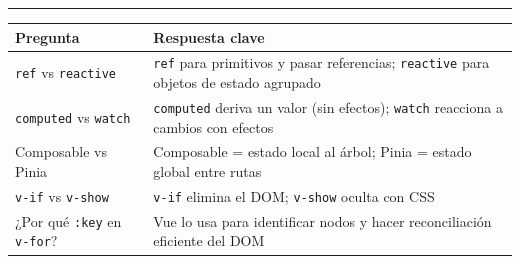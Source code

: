 \documentclass[11pt,a4paper]{article}
\begin{document}
\vspace{1em}
\noindent\textcolor{vuegreen}{\rule{\linewidth}{0.8pt}}
\vspace{0.5em}

\begin{center}
\begin{tabular}{p{5cm} p{8cm}}
\toprule
\textbf{Pregunta} & \textbf{Respuesta clave} \\
\midrule
\texttt{ref} vs \texttt{reactive}
  & \texttt{ref} para primitivos y pasar referencias;
    \texttt{reactive} para objetos de estado agrupado \\
\texttt{computed} vs \texttt{watch}
  & \texttt{computed} deriva un valor (sin efectos);
    \texttt{watch} reacciona a cambios con efectos \\
Composable vs Pinia
  & Composable = estado local al árbol;
    Pinia = estado global entre rutas \\
\texttt{v-if} vs \texttt{v-show}
  & \texttt{v-if} elimina el DOM;
    \texttt{v-show} oculta con CSS \\
¿Por qué \texttt{:key} en \texttt{v-for}?
  & Vue lo usa para identificar nodos y hacer
    reconciliación eficiente del DOM \\
\bottomrule
\end{tabular}
\end{center}
\end{document}
